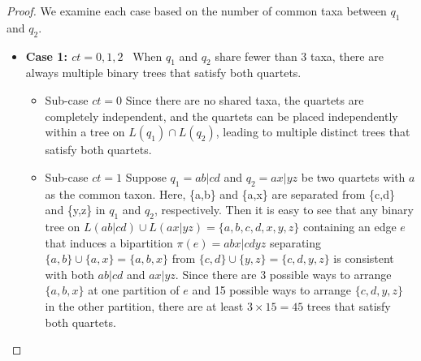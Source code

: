 \documentclass[10pt,a4paper]{article}
\newcommand{\add}[1]{{\color{blue} #1}}
\begin{document}
\begin{proof}


We examine each case based on the number of common taxa between $q_1$ and $q_2$.


\begin{itemize}
    \item \textbf{Case 1: $ct = 0, 1, 2$} \ When $q_1$ and $q_2$ share fewer than 3 taxa, there are always multiple binary trees that satisfy both quartets.



\begin{itemize}
    \item Sub-case $ct = 0$  Since there are no shared taxa, the quartets are completely independent, and the quartets can be placed independently within a tree on $L(q_1) \cap L(q_2)$, leading to multiple distinct trees that satisfy both quartets.

    \item Sub-case $ct = 1$ Suppose $q_1 = ab|cd$ and $q_2 = ax|yz$ be two quartets with $a$ as the common taxon. Here, \{a,b\} and \{a,x\} are separated from \{c,d\} and \{y,z\} in $q_1$ and $q_2$, respectively. Then it is easy to see that any binary tree on $L(ab|cd) \cup L(ax|yz) = \{a,b,c,d,x,y,z\}$ containing an edge $e$ that induces a bipartition $\pi(e) = abx|cdyz$ separating $\{a,b\} \cup \{a,x\} = \{a,b,x\}$ from $\{c,d\} \cup \{y,z\} = \{c,d,y,z\}$ is consistent with both $ab|cd$ and $ax|yz$. Since there are 3 possible ways to arrange $\{a,b,x\}$ at one partition of $e$ and 15 possible ways to arrange $\{c,d,y,z\}$ in the other partition, there are at least $3 \times 15 = 45$ trees that satisfy both quartets.


\end{itemize}
\end{itemize}
\end{proof}
\end{document}
